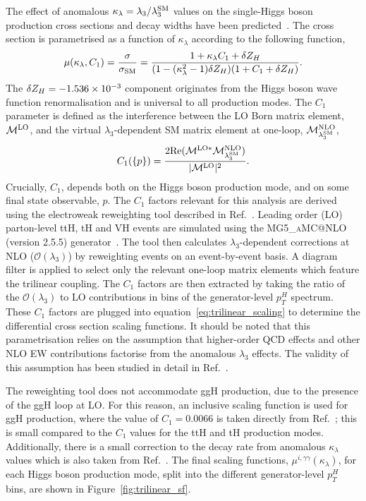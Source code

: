 The effect of anomalous $\kappa_\lambda=\lambda_3/\lambda_3^{\rm{SM}}$ values on the single-Higgs boson production cross sections and decay widths have been predicted~\cite{Maltoni:2017ims}. The cross section is parametrised as a function of $\kappa_\lambda$ according to the following function,
\begin{equation}\label{eq:trilinear_scaling}
    \mu(\kappa_\lambda,C_1) = \frac{\sigma}{\sigma_{\rm{SM}}} = \frac{1+\kappa_\lambda C_1 + \delta Z_H}{(1-(\kappa_\lambda^2-1)\delta Z_H)(1+C_1+\delta Z_H)}.
\end{equation}
The $\delta Z_H=-1.536\times10^{\rm{-3}}$ component originates from the Higgs boson wave function renormalisation and is universal to all production modes. The $C_1$ parameter is defined as the interference between the LO Born matrix element, $\mathcal{M}^{\rm{LO}}$, and the virtual $\lambda_3$-dependent SM matrix element at one-loop, $\mathcal{M}^{\rm{NLO}}_{\lambda_3^{\rm{SM}}}$, 
\begin{equation}
    C_1(\{p\}) = \frac{2{\rm{Re}}(\mathcal{M}^{{\rm{LO}}*}\mathcal{M}^{\rm{NLO}}_{\lambda_3^{\rm{SM}}})}{|\mathcal{M}^{{\rm{LO}}}|^2}.
\end{equation}
\noindent
Crucially, $C_1$, depends both on the Higgs boson production mode, and on some final state observable, $p$. The $C_1$ factors relevant for this analysis are derived using the electroweak reweighting tool described in Ref.~\cite{EWreweightingtool}. Leading order (LO) parton-level ttH, tH and VH events are simulated using the \textsc{MG5\_aMC@NLO} (version 2.5.5) generator~\cite{Alwall:2014hca}. The tool then calculates $\lambda_3$-dependent corrections at NLO ($\mathcal{O}(\lambda_3)$) by reweighting events on an event-by-event basis. A diagram filter is applied to select only the relevant one-loop matrix elements which feature the trilinear coupling. The $C_1$ factors are then extracted by taking the ratio of the $\mathcal{O}(\lambda_3)$ to LO contributions in bins of the generator-level $p_T^H$ spectrum. These $C_1$ factors are plugged into equation~\ref{eq:trilinear_scaling} to determine the differential cross section scaling functions. It should be noted that this parametrisation relies on the assumption that higher-order QCD effects and other NLO EW contributions factorise from the anomalous $\lambda_3$ effects. The validity of this assumption has been studied in detail in Ref.~\cite{Maltoni:2017ims}.

The reweighting tool does not accommodate ggH production, due to the presence of the ggH loop at LO. For this reason, an inclusive scaling function is used for ggH production, where the value of $C_1=0.0066$ is taken directly from Ref.~\cite{Degrassi:2016wml}; this is small compared to the $C_1$ values for the ttH and tH production modes. Additionally, there is a small correction to the \Hgg decay rate from anomalous $\kappa_\lambda$ values which is also taken from Ref.~\cite{Degrassi:2016wml}. The final scaling functions, $\mu^{i,\gamma\gamma}(\kappa_\lambda)$, for each Higgs boson production mode, split into the different generator-level $p_T^H$ bins, are shown in Figure~\ref{fig:trilinear_sf}.

